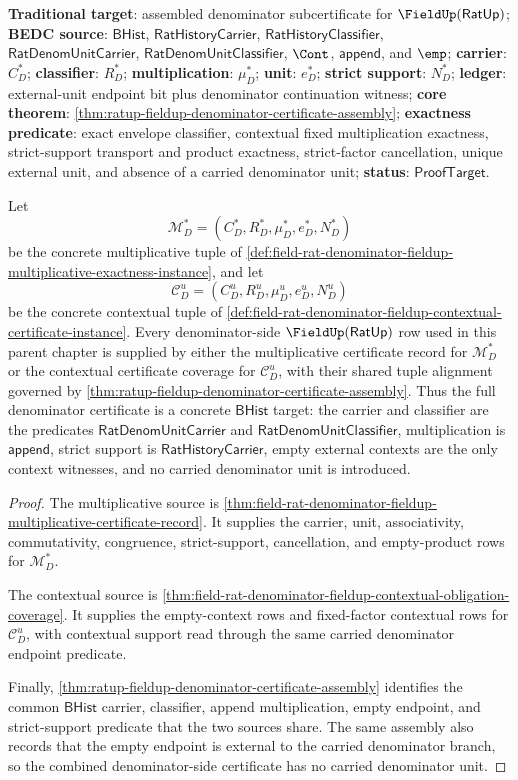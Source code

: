 \textbf{Traditional target}: assembled denominator subcertificate for
$\FieldUp(\mathsf{RatUp})$; \textbf{BEDC source}: $\mathsf{BHist}$,
$\mathsf{RatHistoryCarrier}$, $\mathsf{RatHistoryClassifier}$,
$\mathsf{RatDenomUnitCarrier}$, $\mathsf{RatDenomUnitClassifier}$, $\Cont$,
$\mathsf{append}$, and $\emp$; \textbf{carrier}: $C_D^\ast$;
\textbf{classifier}: $R_D^\ast$; \textbf{multiplication}: $\mu_D^\ast$;
\textbf{unit}: $e_D^\ast$; \textbf{strict support}: $N_D^\ast$;
\textbf{ledger}: external-unit endpoint bit plus denominator continuation
witness; \textbf{core theorem}:
\autoref{thm:ratup-fieldup-denominator-certificate-assembly};
\textbf{exactness predicate}: exact envelope classifier, contextual fixed
multiplication exactness, strict-support transport and product exactness,
strict-factor cancellation, unique external unit, and absence of a carried
denominator unit; \textbf{status}: $\mathsf{ProofTarget}$.

\begin{theorem}
\label{thm:ratup-fieldup-denominator-row-exhaustion}
Let
$$
\mathcal{M}_D^\ast=(C_D^\ast,R_D^\ast,\mu_D^\ast,e_D^\ast,N_D^\ast)
$$
be the concrete multiplicative tuple of
\autoref{def:field-rat-denominator-fieldup-multiplicative-exactness-instance},
and let
$$
\mathcal{C}_D^u=(C_D^u,R_D^u,\mu_D^u,e_D^u,N_D^u)
$$
be the concrete contextual tuple of
\autoref{def:field-rat-denominator-fieldup-contextual-certificate-instance}.
Every denominator-side $\FieldUp(\mathsf{RatUp})$ row used in this parent
chapter is supplied by either the multiplicative certificate record for
$\mathcal{M}_D^\ast$ or the contextual certificate coverage for
$\mathcal{C}_D^u$, with their shared tuple alignment governed by
\autoref{thm:ratup-fieldup-denominator-certificate-assembly}. Thus the full
denominator certificate is a concrete $\mathsf{BHist}$ target: the carrier and
classifier are the predicates $\mathsf{RatDenomUnitCarrier}$ and
$\mathsf{RatDenomUnitClassifier}$, multiplication is $\mathsf{append}$, strict
support is $\mathsf{RatHistoryCarrier}$, empty external contexts are the only
context witnesses, and no carried denominator unit is introduced.
\end{theorem}
\begin{proof}
The multiplicative source is
\autoref{thm:field-rat-denominator-fieldup-multiplicative-certificate-record}.
It supplies the carrier, unit, associativity, commutativity, congruence,
strict-support, cancellation, and empty-product rows for
$\mathcal{M}_D^\ast$.

The contextual source is
\autoref{thm:field-rat-denominator-fieldup-contextual-obligation-coverage}. It
supplies the empty-context rows and fixed-factor contextual rows for
$\mathcal{C}_D^u$, with contextual support read through the same carried
denominator endpoint predicate.

Finally,
\autoref{thm:ratup-fieldup-denominator-certificate-assembly} identifies the
common $\mathsf{BHist}$ carrier, classifier, append multiplication, empty
endpoint, and strict-support predicate that the two sources share. The same
assembly also records that the empty endpoint is external to the carried
denominator branch, so the combined denominator-side certificate has no carried
denominator unit.
\end{proof}
